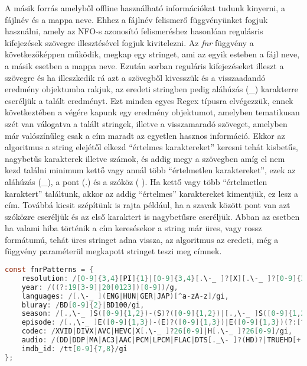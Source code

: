 A másik forrás amelyből offline használható információkat tudunk kinyerni, a fájlnév és a mappa neve. Ehhez a fájlnév felismerő függvényünket fogjuk használni, amely az NFO-s azonosító felismeréshez hasonlóan regulásris kifejezések szövegre illesztésével fogjuk kivitelezni.
Az {\it fnr} függvény a következőképpen működik, megkap egy stringet, ami az egyik esteben a fájl neve, a másik esetben a mappa neve. Ezután sorban reguláris kifejezéseket illeszt a szövegre és ha illeszkedik rá azt a szövegből kivesszük és a visszaadandó eredmény objektumba rakjuk, az eredeti stringben pedig aláhúzás (\_) karakterre cseréljük a talált eredményt. Ezt minden egyes Regex típusra elvégezzük, ennek következtében a végére kapunk egy eredmény objektumot, amelyben tematikusan szét van válogatva a talált stringek, illetve a visszamaradó szöveget, amelyben már valószínűleg csak a cím maradt az egyetlen hasznos információ. Ekkor az algoritmus a string elejétől elkezd ``értelmes karaktereket'' keresni tehát kisbetűs, nagybetűs karakterek illetve számok, és addig megy a szövegben amíg el nem kezd találni minimum kettő vagy annál több ``értelmetlen karaktereket'', ezek az aláhúzás (\_), a pont (.) és a szóköz ( ). Ha kettő vagy több ``értelmetlen karaktert'' találtunk, akkor az addig ``értelmes'' karaktereket kimentjük, ez lesz a cím. Továbbá kicsit szépítünk is rajta például, ha a szavak között pont van azt szóközre cseréljük és az első karaktert is nagybetűsre cseréljük. Abban az esetben ha valami hiba történik a cím keresésekor a string már üres, vagy rossz formátumú, tehát üres stringet adna vissza, az algoritmus az eredeti, még a függvény paraméterül megkapott stringet teszi meg címnek.

\begin{lstlisting}[language={c}]
const fnrPatterns = {
    resolution: /[0-9]{3,4}[PI]{1}|[0-9]{3,4}[.\-_ ]?[X][.\-_ ]?[0-9]{3,4}/gi,
    year: /((?:19[3-9]|20[0123])[0-9])/g,
    languages: /[.\-_ ](ENG|HUN|GER|JAP)[^a-zA-z]/gi,
    bluray: /BD[0-9]{2}|BD100/gi,
    season: /[.,\-_ ]S([0-9]{1,2})-(S)?([0-9]{1,2})|[.,\-_ ]S([0-9]{1,2})|[^0-9]([0-9]{1,2})X/gi,
    episode: /[.,\-_ ]E([0-9]{1,3})-(E)?([0-9]{1,3})|E([0-9]{1,3})(?:[^0-9]|$)|[Xx]([0-9]{1,3})(?:[^0-9]|$)|(EP|EPISODE)([0-9]{1,3})(?:[^0-9]|$)/gi,
    codec: /XVID|DIVX|AVC|HEVC|X[.\-_ ]?26[0-9]|H[.\-_ ]?26[0-9]/gi,
    audio: /(DD|DDP|MA|AC3|AAC|PCM|LPCM|FLAC|DTS[._\- ]?(HD)?|TRUEHD[+._\- ]?ATMOS|TRUEHD|ATMOS)[+._\- ]?[0-9]\.?[0-9]|DTS[._\- ]?(HD|ES)?|DUAL[._\- ]?AUDIO|DOLBY[+._\- ]?(DIGITAL[+._\- ]?(PLUS)?|VISION|ATMOS)|HALF-OU/gi,
    imdb_id: /tt[0-9]{7,8}/gi
};
\end{lstlisting}

